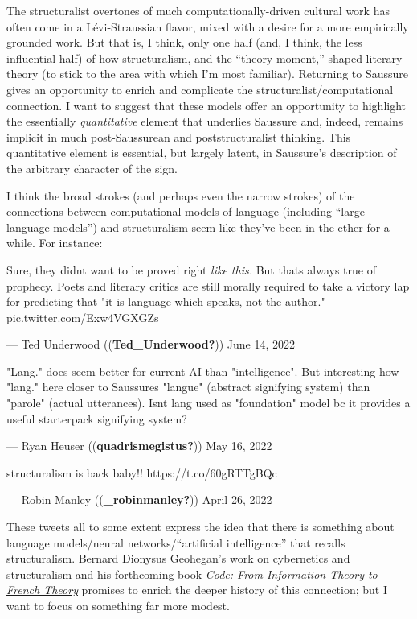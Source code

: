 \documentclass[
  12pt,
]{article}
\begin{document}
The structuralist overtones of much computationally-driven cultural work
has often come in a Lévi-Straussian flavor, mixed with a desire for a
more empirically grounded work. But that is, I think, only one half
(and, I think, the less influential half) of how structuralism, and the
``theory moment,'' shaped literary theory (to stick to the area with
which I'm most familiar). Returning to Saussure gives an opportunity to
enrich and complicate the structuralist/computational connection. I want
to suggest that these models offer an opportunity to highlight the
essentially \emph{quantitative} element that underlies Saussure and,
indeed, remains implicit in much post-Saussurean and poststructuralist
thinking. This quantitative element is essential, but largely latent, in
Saussure's description of the arbitrary character of the sign.

I think the broad strokes (and perhaps even the narrow strokes) of the
connections between computational models of language (including ``large
language models'') and structuralism seem like they've been in the ether
for a while. For instance:

Sure, they didn\textquotesingle t want to be proved right \emph{like
this.} But that\textquotesingle s always true of prophecy. Poets and
literary critics are still morally required to take a victory lap for
predicting that "it is language which speaks, not the author."
pic.twitter.com/Exw4VGXGZs

--- Ted Underwood ((\textbf{Ted\_Underwood?})) June 14, 2022

"Lang." does seem better for current AI than "intelligence". But
interesting how "lang." here closer to Saussure\textquotesingle s
"langue" (abstract signifying system) than "parole" (actual utterances).
Isn\textquotesingle t lang used as "foundation" model bc it provides a
useful starterpack signifying system?

--- Ryan Heuser ((\textbf{quadrismegistus?})) May 16, 2022

structuralism is back baby!! https://t.co/60gRTTgBQc

--- Robin Manley ((\textbf{\_robinmanley?})) April 26, 2022

These tweets all to some extent express the idea that there is something
about language models/neural networks/``artificial intelligence'' that
recalls structuralism. Bernard Dionysus Geohegan's work on cybernetics
and structuralism and his forthcoming book
\href{https://www.dukeupress.edu/code}{\emph{Code: From Information
Theory to French Theory}} promises to enrich the deeper history of this
connection; but I want to focus on something far more modest.
\end{document}
